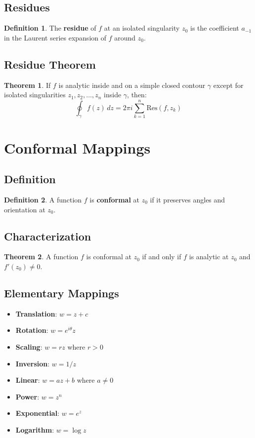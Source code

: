 \documentclass[11pt]{article}
\theoremstyle{definition}
\newtheorem{definition}{Definition}[section]
\newtheorem{theorem}{Theorem}[section]
\begin{document}
\subsection{Residues}
\begin{definition}
The \textbf{residue} of $f$ at an isolated singularity $z_0$ is the coefficient $a_{-1}$ in the Laurent series expansion of $f$ around $z_0$.
\end{definition}

\subsection{Residue Theorem}
\begin{theorem}
If $f$ is analytic inside and on a simple closed contour $\gamma$ except for isolated singularities $z_1, z_2, \ldots, z_n$ inside $\gamma$, then:
$$\oint_\gamma f(z) \, dz = 2\pi i \sum_{k=1}^n \text{Res}(f, z_k)$$
\end{theorem}

\section{Conformal Mappings}

\subsection{Definition}
\begin{definition}
A function $f$ is \textbf{conformal} at $z_0$ if it preserves angles and orientation at $z_0$.
\end{definition}

\subsection{Characterization}
\begin{theorem}
A function $f$ is conformal at $z_0$ if and only if $f$ is analytic at $z_0$ and $f'(z_0) \neq 0$.
\end{theorem}

\subsection{Elementary Mappings}
\begin{itemize}
    \item \textbf{Translation}: $w = z + c$
    \item \textbf{Rotation}: $w = e^{i\theta} z$
    \item \textbf{Scaling}: $w = rz$ where $r > 0$
    \item \textbf{Inversion}: $w = 1/z$
    \item \textbf{Linear}: $w = az + b$ where $a \neq 0$
    \item \textbf{Power}: $w = z^n$
    \item \textbf{Exponential}: $w = e^z$
    \item \textbf{Logarithm}: $w = \log z$
\end{itemize}
\end{document}
